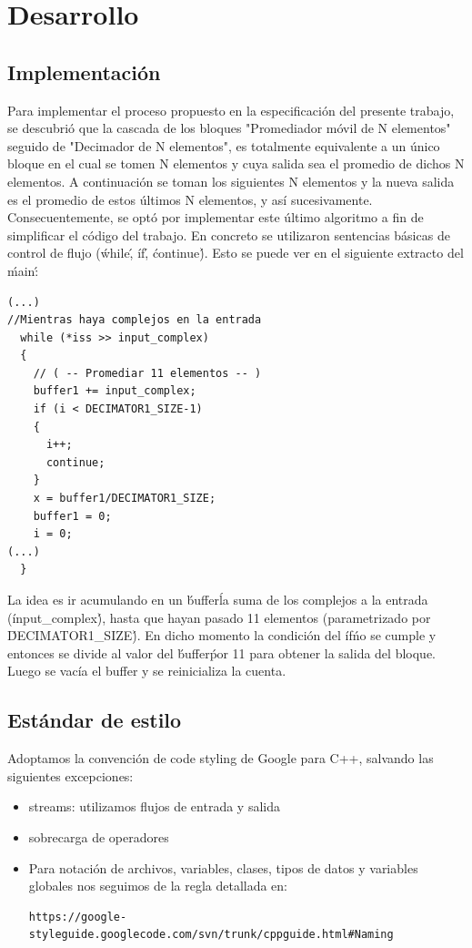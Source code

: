 \documentclass[10pt,a4paper]{article}
\begin{document}
\section{Desarrollo}
\subsection{Implementación}
Para implementar el proceso propuesto en la especificación del presente trabajo, se descubrió que la cascada de los bloques "Promediador móvil de N elementos" seguido de "Decimador de N elementos", es totalmente equivalente a un único bloque en el cual se tomen N elementos y cuya salida sea el promedio de dichos N elementos. A continuación se toman los siguientes N elementos y la nueva salida es el promedio de estos últimos N elementos, y así sucesivamente.\\

 Consecuentemente, se optó por implementar este último algoritmo a fin de simplificar el código del trabajo. En concreto se utilizaron sentencias básicas de control de flujo (\'while\', \'if\', \'continue\'). Esto se puede ver en el siguiente extracto del \'main\':

\begin{verbatim}
(...)
//Mientras haya complejos en la entrada
  while (*iss >> input_complex)
  {
    // ( -- Promediar 11 elementos -- )
    buffer1 += input_complex;
    if (i < DECIMATOR1_SIZE-1)
    {
      i++;
      continue;
    }
    x = buffer1/DECIMATOR1_SIZE;
    buffer1 = 0;
    i = 0;
(...)
  }
\end{verbatim}
La idea es ir acumulando en un \'buffer\' la suma de los complejos a la entrada (\'input\_complex\'), hasta que hayan pasado 11 elementos (parametrizado por \'DECIMATOR1\_SIZE\'). En dicho momento la condición del \'if\' no se cumple y entonces se divide al valor del \'buffer\' por 11 para obtener la salida del bloque. Luego se vacía el buffer y se reinicializa la cuenta.\\



\subsection{Estándar de estilo}
Adoptamos la convención de code styling de Google para C++, salvando las siguientes excepciones:\\
\begin{itemize}
\item streams: utilizamos flujos de entrada y salida
\item sobrecarga de operadores
\item 

Para notación de archivos, variables, clases, tipos de datos y variables globales nos seguimos de la regla detallada en:
\begin{verbatim}
https://google-styleguide.googlecode.com/svn/trunk/cppguide.html#Naming
\end{verbatim}
\end{itemize}
\end{document}
